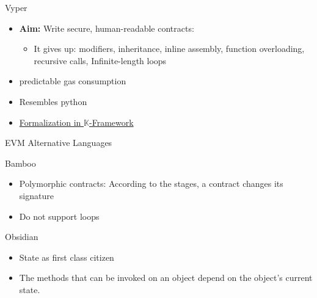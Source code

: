 \begin{frame}{Vyper~\cite{bib:vyper-docs}}

  \begin{itemize}
  	\item \textbf{Aim:} Write secure, human-readable  contracts:
  	\begin{itemize}
  		\item It gives up: modifiers, inheritance, inline assembly, function overloading, recursive calls, Infinite-length loops
  	\end{itemize}
    \item predictable gas consumption
    \item Resembles python
  	\item \href{https://github.com/kframework/vyper-semantics/}{Formalization in $\mathbb{K}$-Framework}
  \end{itemize}

\end{frame}


\begin{frame}{EVM Alternative Languages}
\begin{block}{Bamboo~\cite{bamboo}}
\begin{itemize}
\item Polymorphic contracts: According to the stages, a contract changes its signature
\item Do not support loops
\end{itemize}
\end{block}

\begin{block}{Obsidian~\cite{obsidian}}
  \begin{itemize}
  \item State as first class citizen
  \item The methods that can be invoked on an object depend on the object’s current state.
  \end{itemize}
\end{block}
\end{frame}

